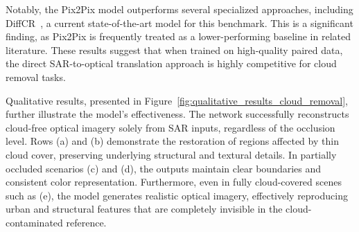 Notably, the Pix2Pix model outperforms several specialized approaches, including DiffCR~\cite{DiffCR}, a current state-of-the-art model for this benchmark. This is a significant finding, as Pix2Pix is frequently treated as a lower-performing baseline in related literature. These results suggest that when trained on high-quality paired data, the direct SAR-to-optical translation approach is highly competitive for cloud removal tasks.

Qualitative results, presented in Figure~\ref{fig:qualitative_results_cloud_removal}, further illustrate the model’s effectiveness. The network successfully reconstructs cloud-free optical imagery solely from SAR inputs, regardless of the occlusion level. Rows (a) and (b) demonstrate the restoration of regions affected by thin cloud cover, preserving underlying structural and textural details. In partially occluded scenarios (c) and (d), the outputs maintain clear boundaries and consistent color representation. Furthermore, even in fully cloud-covered scenes such as (e), the model generates realistic optical imagery, effectively reproducing urban and structural features that are completely invisible in the cloud-contaminated reference.
